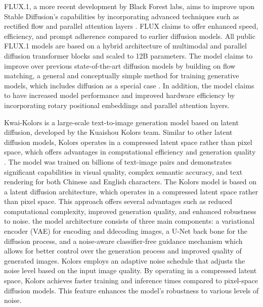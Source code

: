 \documentclass{article}
\begin{document}
FLUX.1, a more recent development by Black Forest labs, aims to improve upon Stable Diffusion's capabilities by incorporating 
advanced techniques such as rectified flow and parallel attention layers \cite{flux2024medium}. FLUX claims to offer enhanced speed, efficiency, 
and prompt adherence compared to earlier diffusion models. All public FLUX.1 models are based on a hybrid architecture of multimodal 
and parallel diffusion transformer blocks and scaled to 12B parameters. The model claims to improve over previous state-of-the-art diffusion 
models by building on flow matching, a general and conceptually simple method for training generative models, which includes 
diffusion as a special case \cite{flux2024main}. In addition, the model claims to have increased model performance and improved hardware efficiency by 
incorporating rotary positional embeddings and parallel attention layers.

Kwai-Kolors is a large-scale text-to-image generation model based on latent diffusion, developed by the Kuaishou Kolors team. 
Similar to other latent diffusion models, Kolors operates in a compressed latent space rather than pixel space, 
which offers advantages in computational efficiency and generation quality \cite{kolors2024}. The model was trained on billions of text-image 
pairs and demonstrates significant capabilities in visual quality, complex semantic accuracy, and text rendering for both 
Chinese and English characters. The Kolors model is based on a latent diffusion architecture, which operates in a compressed 
latent space rather than pixel space. This approach offers several advantages such as reduced computational complexity, improved 
generation quality, and enhanced robustness to noise. the model architecture consists of three main components: a variational encoder 
(VAE) for encoding and ddecoding images, a U-Net back bone for the diffusion process, and a noise-aware classifier-free guidance 
mechanism which allows for better control over the generation process and improved quality of generated images. Kolors employs an 
adaptive noise schedule that adjusts the noise level based on the input image quality. By operating in a compressed latent space, 
Kolors achieves faster training and inference times compared to pixel-space diffusion models. This feature enhances the model's robustness 
to various levels of noise.
\end{document}
